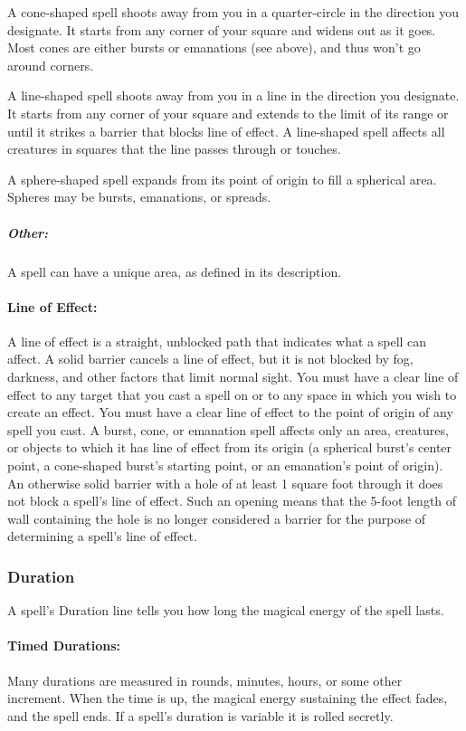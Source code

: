 A cone-shaped spell shoots away from you in a quarter-circle in the direction you designate. 
It starts from any corner of your square and widens out as it goes. 
Most cones are either bursts or emanations (see above), and thus won't go around corners.

A line-shaped spell shoots away from you in a line in the direction you designate. 
It starts from any corner of your square and extends to the limit of its range or until it strikes a barrier that blocks line of effect. 
A line-shaped spell affects all creatures in squares that the line passes through or touches.

A sphere-shaped spell expands from its point of origin to fill a spherical area. Spheres may be bursts, emanations, or spreads.

\subparagraph{Other:} A spell can have a unique area, as defined in its description.

\paragraph{Line of Effect:} A line of effect is a straight, unblocked path that indicates what a spell can affect. 
A solid barrier cancels a line of effect, but it is not blocked by fog, darkness, and other factors that limit normal sight. 
You must have a clear line of effect to any target that you cast a spell on or to any space in which you wish to create an effect. 
You must have a clear line of effect to the point of origin of any spell you cast.
A burst, cone, or emanation spell affects only an area, creatures, or objects to which it has line of effect from its origin (a spherical burst's center point, a cone-shaped burst's starting point, or an emanation's point of origin). 
An otherwise solid barrier with a hole of at least 1 square foot through it does not block a spell's line of effect. 
Such an opening means that the 5-foot length of wall containing the hole is no longer considered a barrier for the purpose of determining a spell's line of effect.

\subsubsection{Duration}
A spell's Duration line tells you how long the magical energy of the spell lasts.

\paragraph{Timed Durations:} Many durations are measured in rounds, minutes, hours, or some other increment. When the time is up, the magical energy sustaining the effect fades, and the spell ends. If a spell's duration is variable it is rolled secretly.

